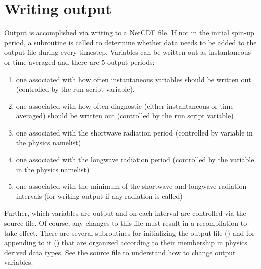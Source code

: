 \section{Writing output}
Output is accomplished via writing to a NetCDF file. If not in the initial spin-up period, a subroutine is called to determine whether data needs to be added to the output file during every timestep. Variables can be written out as instantaneous or time-averaged and there are 5 output periods:
\begin{enumerate}
\item one associated with how often instantaneous variables should be written out (controlled by the  run script variable).
\item one associated with how often diagnostic (either instantaneous or time-averaged) should be written out (controlled by the  run script variable)
\item one associated with the shortwave radiation period (controlled by  variable in the physics namelist)
\item one associated with the longwave radiation period (controlled by the  variable in the physics namelist)
\item one associated with the minimum of the shortwave and longwave radiation intervals (for writing output if any radiation is called)
\end{enumerate}

Further, which variables are output and on each interval are controlled via the  source file. Of course, any changes to this file must result in a recompilation to take effect. There are several subroutines for initializing the output file () and for appending to it () that are organized according to their membership in physics derived data types. See the  source file to understand how to change output variables.
